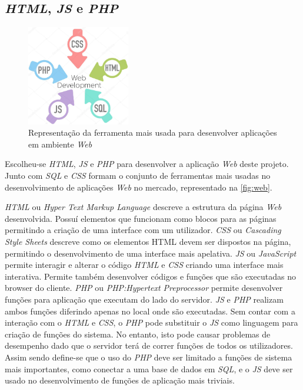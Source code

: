 \documentclass[11pt,twoside,a4paper]{report}
\begin{document}
\subsection{\textit{HTML}, \textit{JS} e \textit{PHP}}
\begin{figure}[H]
	\begin{center}
		\includegraphics[width=0.4\textwidth]{web} %
		\caption{Representação da ferramenta mais usada para desenvolver aplicações em ambiente \textit{Web}}
		\label{fig:web}
	\end{center}
\end{figure}
Escolheu-se \textit{HTML}, \textit{JS} e \textit{PHP} para desenvolver a aplicação \textit{Web} deste projeto. Junto com \textit{SQL} e \textit{CSS} formam o conjunto de ferramentas mais usadas no desenvolvimento de aplicações \textit{Web} no mercado, representado na \autoref{fig:web}.\par 
\textit{HTML} ou \textit{Hyper Text Markup Language} descreve a estrutura da página \textit{Web} desenvolvida. Possuí elementos que funcionam como blocos para as páginas permitindo a criação de uma interface com um utilizador. \textit{CSS} ou \textit{Cascading Style Sheets} descreve como os elementos HTML devem ser dispostos na página, permitindo o desenvolvimento de uma interface mais apelativa. \textit{JS} ou \textit{JavaScript} permite interagir e alterar o código \textit{HTML} e \textit{CSS} criando uma interface mais interativa. Permite também desenvolver códigos e funções que são executadas no browser do cliente. \textit{PHP} ou \textit{PHP:Hypertext Preprocessor} permite desenvolver funções para aplicação que executam do lado do servidor. \textit{JS} e \textit{PHP} realizam ambos funções diferindo apenas no local onde são executadas. Sem contar com a interação com o \textit{HTML} e \textit{CSS}, o \textit{PHP} pode substituir o \textit{JS} como linguagem para criação de funções do sistema. No entanto, isto pode causar problemas de desempenho dado que o servidor terá de correr funções de todos os utilizadores. Assim sendo define-se que o uso do \textit{PHP} deve ser limitado a funções de sistema mais importantes, como conectar a uma base de dados em \textit{SQL}, e o \textit{JS} deve ser usado no desenvolvimento de funções de aplicação mais triviais.
\end{document}
